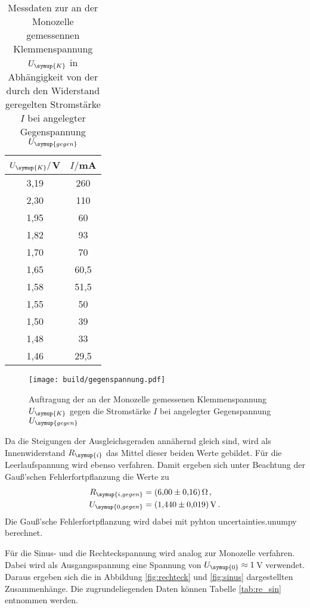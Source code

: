 \begin{table}
  \centering
  \caption{Messdaten zur an der Monozelle gemessennen Klemmenspannung $U_{\symup{K}}$
  in Abhängigkeit von der durch den Widerstand geregelten Stromstärke $I$ bei angelegter
  Gegenspannung $U_{\symup{gegen}}$}
  \label{tab:gegenspannung}
  \begin{tabular}{c c}
    \toprule
    $U_{\symup{K}}/$V & $I/$mA\\
    \midrule
    3,19	&  260\\
    2,30	&  110\\
    1,95	&  60\\
    1,82	&  93\\
    1,70	&  70\\
    1,65	&  60,5\\
    1,58	&  51,5\\
    1,55	&  50\\
    1,50	&  39\\
    1,48	&  33\\
    1,46	&  29,5\\
    \bottomrule
  \end{tabular}
\end{table}

\begin{figure}
  \centering
  \texttt{[image: build/gegenspannung.pdf]}
  \caption{Auftragung der an der Monozelle gemessenen Klemmenspannung $U_{\symup{K}}$
  gegen die Stromstärke $I$ bei angelegter Gegenspannung $U_{\symup{gegen}}$ }
  \label{fig:gegenspannung}
\end{figure}

Da die Steigungen der Ausgleichsgeraden annähernd gleich sind, wird als Innenwiderstand $R_{\symup{i}}$
das Mittel dieser beiden Werte gebildet. Für die Leerlaufspannung wird ebenso verfahren.
Damit ergeben sich unter Beachtung der Gauß'schen Fehlerfortpflanzung die Werte zu
\begin{align*}
  R_{\symup{i,gegen}} &= \SI{6.00(016)}{\ohm} \,,\\
  U_{\symup{0,gegen}} &= \SI{1.440(0019)}{\volt} \,.
\end{align*}
Die Gauß'sche Fehlerfortpflanzung wird dabei mit pyhton uncertainties.unumpy
berechnet.

Für die Sinus- und die Rechteckspannung wird analog zur Monozelle verfahren. Dabei
wird als Ausgangsspannung eine Spannung von $U_{\symup{0}}\approx1$\,V verwendet.
Daraus ergeben sich die in Abbildung \ref{fig:rechteck} und \ref{fig:sinus} dargestellten
Zusammenhänge. Die zugrundeliegenden Daten können Tabelle \ref{tab:re_sin} entnommen
werden.

